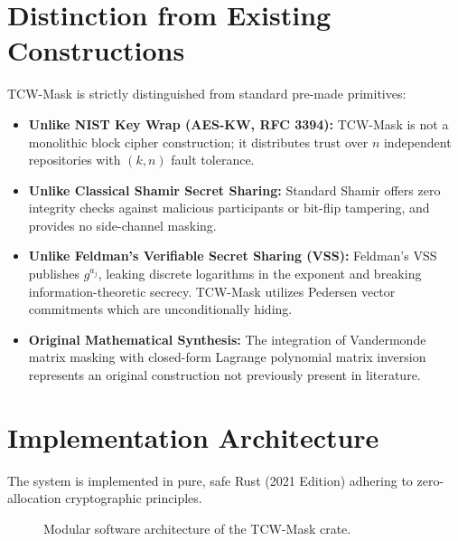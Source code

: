\documentclass[10pt,journal,compsoc]{IEEEtran}
\begin{document}
\section{Distinction from Existing Constructions}
TCW-Mask is strictly distinguished from standard pre-made primitives:
\begin{itemize}
    \item \textbf{Unlike NIST Key Wrap (AES-KW, RFC 3394):} TCW-Mask is not a monolithic block cipher construction; it distributes trust over $n$ independent repositories with $(k, n)$ fault tolerance.
    \item \textbf{Unlike Classical Shamir Secret Sharing:} Standard Shamir offers zero integrity checks against malicious participants or bit-flip tampering, and provides no side-channel masking.
    \item \textbf{Unlike Feldman's Verifiable Secret Sharing (VSS):} Feldman's VSS publishes $g^{a_j}$, leaking discrete logarithms in the exponent and breaking information-theoretic secrecy. TCW-Mask utilizes Pedersen vector commitments which are unconditionally hiding.
    \item \textbf{Original Mathematical Synthesis:} The integration of Vandermonde matrix masking with closed-form Lagrange polynomial matrix inversion represents an original construction not previously present in literature.
\end{itemize}

\section{Implementation Architecture}

The system is implemented in pure, safe Rust (2021 Edition) adhering to zero-allocation cryptographic principles.

\begin{figure}[!h]
\centering
{}
\caption{Modular software architecture of the TCW-Mask crate.}
\label{fig:software_architecture}
\end{figure}
\end{document}
